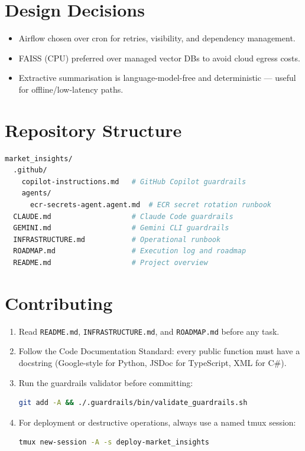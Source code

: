 \documentclass[11pt,a4paper]{article}
\begin{document}
\section{Design Decisions}

\begin{itemize}
  \item Airflow chosen over cron for retries, visibility, and dependency management.
  \item FAISS (CPU) preferred over managed vector DBs to avoid cloud egress costs.
  \item Extractive summarisation is language-model-free and deterministic —
    useful for offline/low-latency paths.
\end{itemize}


\section{Repository Structure}
\begin{lstlisting}[language=bash,caption={Top-level directory layout}]
market_insights/
  .github/
    copilot-instructions.md   # GitHub Copilot guardrails
    agents/
      ecr-secrets-agent.agent.md  # ECR secret rotation runbook
  CLAUDE.md                   # Claude Code guardrails
  GEMINI.md                   # Gemini CLI guardrails
  INFRASTRUCTURE.md           # Operational runbook
  ROADMAP.md                  # Execution log and roadmap
  README.md                   # Project overview
\end{lstlisting}

\section{Contributing}
\begin{enumerate}
  \item Read \texttt{README.md}, \texttt{INFRASTRUCTURE.md}, and \texttt{ROADMAP.md} before any task.
  \item Follow the Code Documentation Standard: every public function must have
    a docstring (Google-style for Python, JSDoc for TypeScript, XML for C\#).
  \item Run the guardrails validator before committing:
    \begin{lstlisting}[language=bash]
git add -A && ./.guardrails/bin/validate_guardrails.sh
    \end{lstlisting}
  \item For deployment or destructive operations, always use a named tmux session:
    \begin{lstlisting}[language=bash]
tmux new-session -A -s deploy-market_insights
    \end{lstlisting}
\end{enumerate}
\end{document}
